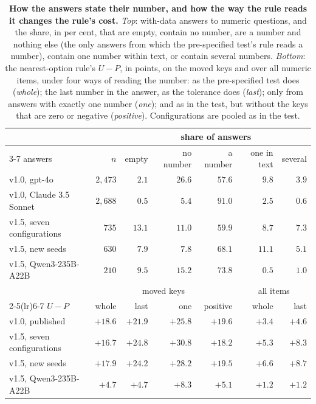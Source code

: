 \documentclass{article}
\begin{document}
\begin{table}[htbp]
\centering\footnotesize\setlength{\tabcolsep}{3pt}
\caption{\textbf{How the answers state their number, and how the way the rule reads it changes the rule's cost.}
\emph{Top}: with-data answers to numeric questions, and the share, in per cent, that are empty, contain no number,
are a number and nothing else (the only answers from which the pre-specified test's rule reads a number), contain one
number within text, or contain several numbers. \emph{Bottom}: the nearest-option rule's $U-P$, in points, on the
moved keys and over all numeric items, under four ways of reading the number: as the pre-specified test does
(\emph{whole}); the last number in the answer, as the tolerance does (\emph{last}); only from answers with exactly
one number (\emph{one}); and as in the test, but without the keys that are zero or negative (\emph{positive}).
Configurations are pooled as in the test.}
\label{tab:extraction}
\begin{tabular}{lrrrrrr}
\toprule
& & \multicolumn{5}{c}{share of answers}\\
\cmidrule(lr){3-7}
answers & $n$ & empty & no number & a number & one in text & several\\
\midrule
v1.0, gpt-4o & $2{,}473$ & $2.1$ & $26.6$ & $57.6$ & $9.8$ & $3.9$\\
v1.0, Claude 3.5 Sonnet & $2{,}688$ & $0.5$ & $5.4$ & $91.0$ & $2.5$ & $0.6$\\
v1.5, seven configurations & $735$ & $13.1$ & $11.0$ & $59.9$ & $8.7$ & $7.3$\\
v1.5, new seeds & $630$ & $7.9$ & $7.8$ & $68.1$ & $11.1$ & $5.1$\\
v1.5, Qwen3-235B-A22B & $210$ & $9.5$ & $15.2$ & $73.8$ & $0.5$ & $1.0$\\
\midrule
& \multicolumn{4}{c}{moved keys} & \multicolumn{2}{c}{all items}\\
\cmidrule(lr){2-5}\cmidrule(lr){6-7}
$U-P$ & whole & last & one & positive & whole & last\\
\midrule
v1.0, published & $+18.6$ & $+21.9$ & $+25.8$ & $+19.6$ & $+3.4$ & $+4.6$\\
v1.5, seven configurations & $+16.7$ & $+24.8$ & $+30.8$ & $+18.2$ & $+5.3$ & $+8.3$\\
v1.5, new seeds & $+17.9$ & $+24.2$ & $+28.2$ & $+19.5$ & $+6.6$ & $+8.7$\\
v1.5, Qwen3-235B-A22B & $+4.7$ & $+4.7$ & $+8.3$ & $+5.1$ & $+1.2$ & $+1.2$\\
\bottomrule
\end{tabular}
\end{table}
\end{document}
